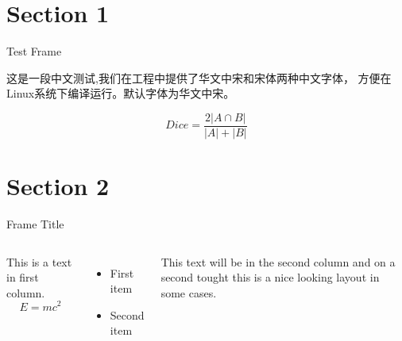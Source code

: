 \section{Section 1}
\begin{frame}[c]{Test Frame} %

    这是一段中文测试,我们在工程中提供了华文中宋和宋体两种中文字体， 方便在Linux系统下编译运行。默认字体为华文中宋。

    \[Dice = \frac{2 |A \cap B|}{|A| + |B|}\]
\end{frame}
 
\section{Section 2}
\begin{frame}[c]{Frame Title}
    \begin{columns}
    This is a text in first column.
    $$E=mc^2$$
    \begin{itemize}
    \item First item
    \item Second item
    \end{itemize}
     
    This text will be in the second column
    and on a second tought this is a nice looking
    layout in some cases.
    \end{columns}
\end{frame}


